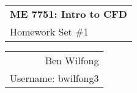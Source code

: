 \documentclass[reqno]{amsart}
\def\name{Ben Wilfong} %
\def\ID{bwilfong3} %
\begin{document}
	\noindent
	\thispagestyle{firststyle}
	\begin{tabular}{l}
		{\LARGE \textbf{ME 7751: Intro to CFD} }\\
		{\Large Homework Set \#1}
	\end{tabular} \hfill \begin{tabular}{r}
		\name \\
		Username: \ID
	\end{tabular}
	\noindent\makebox[\linewidth]{\rule{\textwidth}{1pt}}
\end{document}
